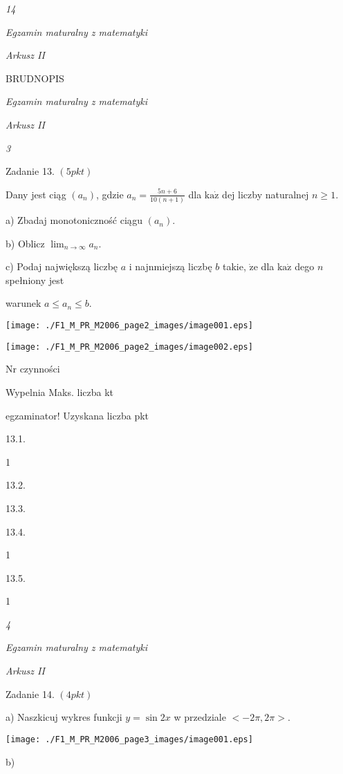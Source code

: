 \documentclass[a4paper,12pt]{article}
\begin{document}
{\it 14}

{\it Egzamin maturalny z matematyki}

{\it Arkusz II}

BRUDNOPIS





{\it Egzamin maturalny z matematyki}

{\it Arkusz II}

{\it 3}

Zadanie 13. $(5pkt)$

Dany jest ciąg $(a_{n})$, gdzie $a_{n}=\displaystyle \frac{5n+6}{10(n+1)}$ dla $\mathrm{k}\mathrm{a}\dot{\mathrm{z}}$ dej liczby naturalnej $n\geq 1.$

a) Zbadaj monotoniczność ciągu $(a_{n}).$

b) Oblicz $\displaystyle \lim_{n\rightarrow\infty}a_{n}.$

c) Podaj największą liczbę $a$ i najnmiejszą liczbę $b$ takie, $\dot{\mathrm{z}}\mathrm{e}$ dla $\mathrm{k}\mathrm{a}\dot{\mathrm{z}}$ dego $n$ spełniony jest

warunek $a\leq a_{n}\leq b.$
\begin{center}
\texttt{[image: ./F1\_M\_PR\_M2006\_page2\_images/image001.eps]}

\texttt{[image: ./F1\_M\_PR\_M2006\_page2\_images/image002.eps]}
\end{center}
Nr czynności

Wypelnia Maks. liczba kt

egzaminator! Uzyskana liczba pkt

13.1.

1

13.2.

13.3.

13.4.

1

13.5.

1





{\it 4}

{\it Egzamin maturalny z matematyki}

{\it Arkusz II}

Zadanie 14. $(4pkt)$

a) Naszkicuj wykres funkcji $y=\sin 2x$ w przedziale $<-2\pi,2\pi>.$
\begin{center}
\texttt{[image: ./F1\_M\_PR\_M2006\_page3\_images/image001.eps]}
\end{center}
b)
\end{document}
